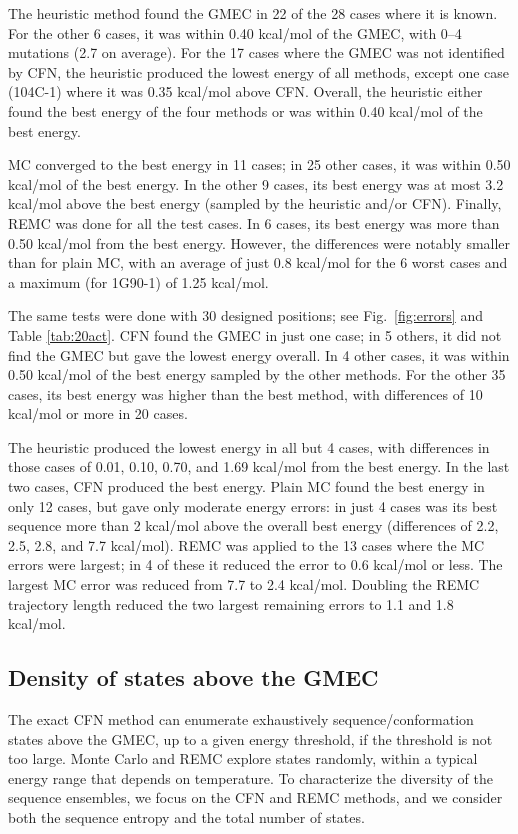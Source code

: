 \documentclass[a4paper,12pt]{article}
\begin{document}
The heuristic method found the GMEC in 22 of the 28 cases where it is known. For the other 6 cases, it was within 0.40
kcal/mol of the GMEC, with 0--4 mutations (2.7 on average). For the 17 cases where the GMEC was not identified by CFN,
the heuristic produced the lowest energy of all methods, except one case (104C-1) where it was 0.35 kcal/mol above CFN.
Overall, the heuristic either found the best energy of the four methods or was within 0.40 kcal/mol of the best energy.

MC converged to the best energy in 11 cases; in 25 other cases, it was within 0.50 kcal/mol of the best energy. In the
other 9 cases, its best energy was at most 3.2 kcal/mol above the best energy (sampled by the heuristic and/or CFN).
Finally, REMC was done for all the test cases. In 6 cases, its best energy was more than 0.50 kcal/mol from the best
energy. However, the differences were notably smaller than for plain MC, with an average of just 0.8 kcal/mol for the
6 worst cases and a maximum (for 1G90-1) of 1.25 kcal/mol.

The same tests were done with 30 designed positions; see Fig.\ \ref{fig:errors} and Table \ref{tab:20act}. CFN
found the GMEC in just one case; in 5 others, it did not find the GMEC but gave the lowest energy overall. In 4
other cases, it was within 0.50 kcal/mol of the best energy sampled by the other methods. For the other 35 cases,
its best energy was higher than the best method, with differences of 10 kcal/mol or more in 20 cases.

The heuristic produced the lowest energy in all but 4 cases, with differences in those cases of 0.01, 0.10, 0.70, and
1.69 kcal/mol from the best energy. In the last two cases, CFN produced the best energy. Plain MC found the best energy
in only 12 cases, but gave only moderate energy errors: in just 4 cases was its best sequence more than 2 kcal/mol above
the overall best energy (differences of 2.2, 2.5, 2.8, and 7.7 kcal/mol). REMC was applied to the 13 cases where the
MC errors were largest; in 4 of these it reduced the error to 0.6 kcal/mol or less. The largest MC error was reduced
from 7.7 to 2.4 kcal/mol. Doubling the REMC trajectory length reduced the two largest remaining errors to 1.1 and
1.8 kcal/mol.

\subsection{Density of states above the GMEC}
The exact CFN method can enumerate exhaustively sequence/conformation states above the GMEC, up to a given energy
threshold, if the threshold is not too large. Monte Carlo and REMC explore states randomly, within a typical energy
range that depends on temperature. To characterize the diversity of the sequence ensembles, we focus on the CFN and
REMC methods, and we consider both the sequence entropy and the total number of states. 
\end{document}
